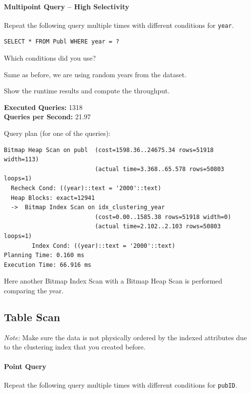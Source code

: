 \documentclass[11pt]{scrartcl}
\begin{document}
\paragraph{Multipoint Query -- High Selectivity}

Repeat the following query multiple times with different conditions for \texttt{year}.

\begin{lstlisting}[style=dbtsql]
SELECT * FROM Publ WHERE year = ?
\end{lstlisting}

Which conditions did you use?

Same as before, we are using random years from the dataset.

Show the runtime results and compute the throughput.

\textbf{Executed Queries: } 1318\\
\textbf{Queries per Second: } 21.97

Query plan (for one of the queries):

{\small
\parskip0pt\begin{verbatim}
Bitmap Heap Scan on publ  (cost=1598.36..24675.34 rows=51918 width=113)
                          (actual time=3.368..65.578 rows=50803 loops=1)
  Recheck Cond: ((year)::text = '2000'::text)
  Heap Blocks: exact=12941
  ->  Bitmap Index Scan on idx_clustering_year
                          (cost=0.00..1585.38 rows=51918 width=0)
                          (actual time=2.102..2.103 rows=50803 loops=1)
        Index Cond: ((year)::text = '2000'::text)
Planning Time: 0.160 ms
Execution Time: 66.916 ms
\end{verbatim}}

Here another Bitmap Index Scan with a Bitmap Heap Scan is performed comparing the year.

\subsection*{Table Scan}

\emph{Note:} Make sure the data is not physically ordered by the indexed attributes due to the clustering index that you created before.

\paragraph{Point Query}

Repeat the following query multiple times with different conditions for \texttt{pubID}.
\end{document}
